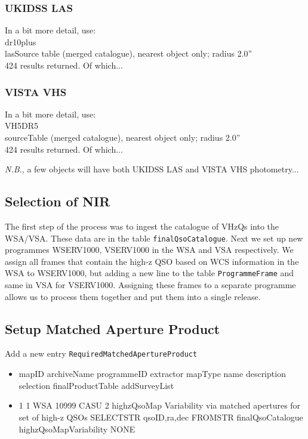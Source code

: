 \documentclass[usenatbib]{mnras}
\begin{document}
\subsubsection{UKIDSS LAS} 
In a bit more detail, use:\\
dr10plus\\
lasSource table (merged catalogue), nearest object only; radius 2.0'' \\
424 results returned. Of which...


\subsubsection{VISTA VHS} 
In a bit more detail, use:\\
VH5DR5 \\
sourceTable (merged catalogue), nearest object only; radius 2.0'' \\
424 results returned.  Of which...

{\it N.B.}, a few objects will have both UKIDSS LAS and VISTA VHS photometry...



\subsection{Selection of NIR}

The first step of the process was to ingest the catalogue of VHzQs into
the WSA/VSA. These data are in the table \verb+finalQsoCatalogue+. Next we set
up new programmes WSERV1000, VSERV1000 in the WSA and VSA respectively. We
assign all frames that contain the high-z QSO based on WCS information in the
WSA to WSERV1000, but adding a new line to the table \verb+ProgrammeFrame+ and
same in VSA for VSERV1000. Assigning these frames to a separate programme allows
us to process them together and put them into a single release. 

\subsection{Setup Matched Aperture Product}

Add a new entry \verb+RequiredMatchedApertureProduct+

\begin{itemize}
\item mapID	archiveName	programmeID	extractor	mapType	name	description	selection	finalProductTable	addSurveyList
\item 1	1	WSA	10999	CASU	2	highzQsoMap	Variability via matched apertures for set of high-z QSOs	SELECTSTR qsoID,ra,dec FROMSTR finalQsoCatalogue	highzQsoMapVariability	NONE
\end{itemize}
\end{document}
